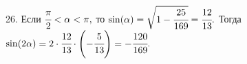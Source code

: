 26. Если $\cfrac{\pi}{2}<\alpha<\pi,$ то  $\sin(\alpha)=\sqrt{1-\cfrac{25}{169}}=\cfrac{12}{13}.$ Тогда $\sin(2\alpha)=2\cdot\cfrac{12}{13}\cdot\left(-\cfrac{5}{13}\right)=-\cfrac{120}{169}.$\\
